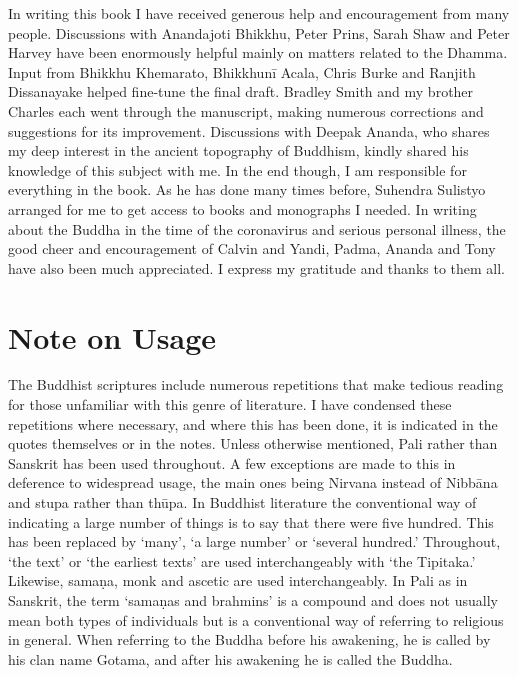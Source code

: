 In writing this book I have received generous help and encouragement
from many people. Discussions with Anandajoti Bhikkhu, Peter Prins,
Sarah Shaw and Peter Harvey have been enormously helpful mainly on
matters related to the Dhamma. Input from Bhikkhu Khemarato, Bhikkhunī
Acala, Chris Burke and Ranjith Dissanayake helped fine-tune the final
draft. Bradley Smith and my brother Charles each went through the
manuscript, making numerous corrections and suggestions for its
improvement. Discussions with Deepak Ananda, who shares my deep interest
in the ancient topography of Buddhism, kindly shared his knowledge of
this subject with me. In the end though, I am responsible for everything
in the book. As he has done many times before, Suhendra Sulistyo
arranged for me to get access to books and monographs I needed. In
writing about the Buddha in the time of the coronavirus and serious
personal illness, the good cheer and encouragement of Calvin and Yandi,
Padma, Ananda and Tony have also been much appreciated. I express my
gratitude and thanks to them all.

\label{footprints_split_003.html_calibre_pb_7}

\label{footprints_split_004.html}{}

\section{Note on Usage}\label{footprints_split_004.html_TOCTarget0-5}

The Buddhist scriptures include numerous repetitions that make tedious
reading for those unfamiliar with this genre of literature. I have
condensed these repetitions where necessary, and where this has been
done, it is indicated in the quotes themselves or in the notes. Unless
otherwise mentioned, Pali rather than Sanskrit has been used throughout.
A few exceptions are made to this in deference to widespread usage, the
main ones being Nirvana instead of Nibbāna and stupa rather than thūpa.
In Buddhist literature the conventional way of indicating a large number
of things is to say that there were five hundred. This has been replaced
by `many', `a large number' or `several hundred.' Throughout, `the text'
or `the earliest texts' are used interchangeably with `the Tipitaka.'
Likewise, samaṇa, monk and ascetic are used interchangeably. In Pali as
in Sanskrit, the term `samaṇas and brahmins' is a compound and does not
usually mean both types of individuals but is a conventional way of
referring to religious in general. When referring to the Buddha before
his awakening, he is called by his clan name Gotama, and after his
awakening he is called the Buddha.

